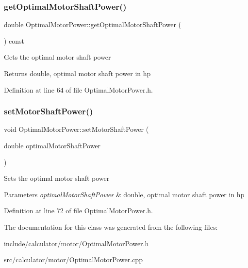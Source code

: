 \subsubsection{\texorpdfstring{get\+Optimal\+Motor\+Shaft\+Power()}{getOptimalMotorShaftPower()}}
{\footnotesize\ttfamily double Optimal\+Motor\+Power\+::get\+Optimal\+Motor\+Shaft\+Power (\begin{DoxyParamCaption}{ }\end{DoxyParamCaption}) const\hspace{0.3cm}{\ttfamily [inline]}}

Gets the optimal motor shaft power \begin{DoxyReturn}{Returns}
double, optimal motor shaft power in hp 
\end{DoxyReturn}


Definition at line 64 of file Optimal\+Motor\+Power.\+h.

\mbox{\label{class_optimal_motor_power_ada8a9e3caac34c54470ad13ffe7edf53}} 
\subsubsection{\texorpdfstring{set\+Motor\+Shaft\+Power()}{setMotorShaftPower()}}
{\footnotesize\ttfamily void Optimal\+Motor\+Power\+::set\+Motor\+Shaft\+Power (\begin{DoxyParamCaption}\item[{double}]{optimal\+Motor\+Shaft\+Power }\end{DoxyParamCaption})\hspace{0.3cm}{\ttfamily [inline]}}

Sets the optimal motor shaft power 
\begin{DoxyParams}{Parameters}
{\em optimal\+Motor\+Shaft\+Power} & double, optimal motor shaft power in hp \\
\hline
\end{DoxyParams}


Definition at line 72 of file Optimal\+Motor\+Power.\+h.



The documentation for this class was generated from the following files\+:\begin{DoxyCompactItemize}
\item 
include/calculator/motor/Optimal\+Motor\+Power.\+h\item 
src/calculator/motor/Optimal\+Motor\+Power.\+cpp\end{DoxyCompactItemize}
